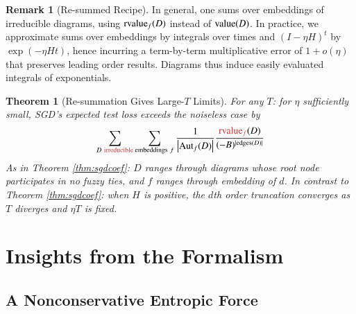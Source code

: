 \documentclass{article}
\theoremstyle{plain}
\newtheorem{thm}{Theorem}
\theoremstyle{definition}
\newtheorem{rmk}{Remark}
\newcommand{\wabs}[1]{\left|#1\right|}
\newcommand{\Aut}{\text{\textnormal{Aut}}}
\newcommand{\dvalue}{\text{\textnormal{value}}}
\newcommand{\rvalue}{\text{\textnormal{rvalue}}}
\newcommand{\edges}{\text{\textnormal{edges}}}
\begin{document}
        \begin{rmk}[Re-summed Recipe]
            In general, one sums over embeddings of irreducible diagrams, using
            $\rvalue_f(D)$ instead of $\dvalue(D)$.  In practice, we
            approximate sums over embeddings by integrals over times and
            $(I-\eta H)^t$ by $\exp(- \eta H t)$, hence incurring a
            term-by-term multiplicative error of $1 + o(\eta)$ that preserves
            leading order results.  Diagrams thus induce easily evaluated
            integrals of exponentials.
        \end{rmk}
       
        \begin{thm}[Re-summation Gives Large-$T$ Limits] \label{thm:resum}
            For any $T$: for $\eta$ sufficiently small, SGD's expected test
            loss exceeds the noiseless case by 
            \begin{equation*} \label{eq:resum}
                \sum_{\substack{
                    D~{\color{moor}\text{irreducible}}
                }}
                \sum_{\text{embeddings}~f}
                \frac{1}{\wabs{\Aut_f(D)}}
                \frac{{\color{moor}\rvalue_f}(D)}{(-B)^{|\edges(D)|}}
            \end{equation*}
            As in Theorem \ref{thm:sgdcoef}: $D$ ranges through diagrams whose
            root node participates in no fuzzy ties, and $f$ ranges through
            embedding of $d$. 
            In contrast to Theorem \ref{thm:sgdcoef}: when $H$ is positive, the
            $d$th order truncation converges as $T$ diverges and $\eta T$ is
            fixed.
        \end{thm}

\section{Insights from the Formalism}

    \subsection{A Nonconservative Entropic Force}
\end{document}
